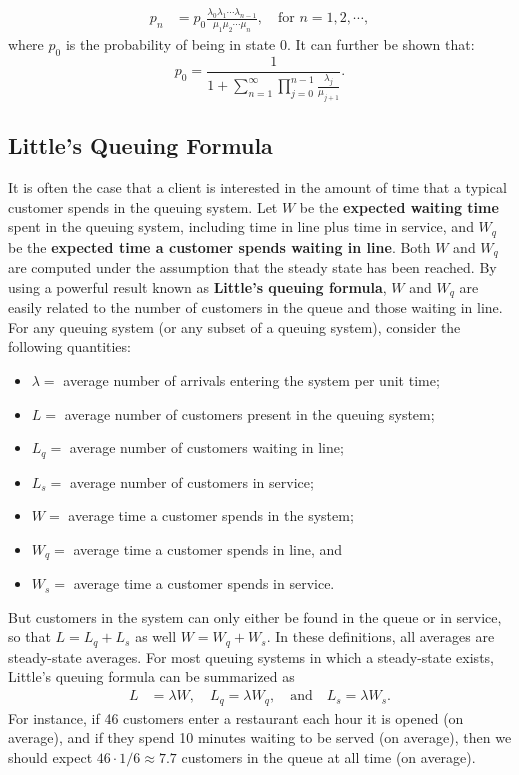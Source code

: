 \begin{align} p_{n} &= p_{0}\frac{\lambda_{0} \lambda_{1} \cdots \lambda_{n-1}}{\mu_{1} \mu_{2} \cdots \mu_{n}},\quad  \text{for    } n=1,2,\cdots,\label{eq:ssbr}
\end{align}
where $p_{0}$ is  the probability of being in state 0. It can further be shown  \cite{QS_K1} that:
$$ p_{0} = \frac{1}{1+ \sum^{\infty}_{n=1} \prod^{n-1}_{j=0} \frac{\lambda_{j}}{\mu_{j+1}}}.$$ 

\subsection{Little's Queuing Formula}
It is often the case that a client is interested in the amount of time that a typical customer spends in the queuing system. Let $W$ be the \textbf{expected waiting time} spent in the queuing system, including time in line plus time in service, and $W_{q}$ be the \textbf{expected time a customer spends waiting in line}. Both $W$ and $W_{q}$ are computed under the assumption that the steady state has been reached. By using a powerful result known as \textbf{Little's queuing formula}, $W$ and $W_{q}$ are easily related to the number of customers in the queue and those waiting in line. \newl  For any queuing system (or any subset of a queuing system), consider the following quantities:
\begin{itemize}[noitemsep]
\item $\lambda = $  average number of arrivals entering the system per unit time; 
\item $L =$  average number of customers present in the queuing system;
\item $L_{q} = $  average number of customers waiting in line;
\item $L_{s} = $  average number of customers in service;
\item $W = $  average time a customer spends in the system;
\item $W_{q} = $  average time a customer spends in line, and
\item $W_{s} = $  average time a customer spends in service.
\end{itemize}
But customers in the system can only either be found in the queue or in service, so that $L = L_{q} + L_{s}$ as well $W = W_{q} + W_{s}$.  In these definitions, all averages are steady-state averages. For most queuing systems in which a steady-state exists, Little's queuing formula can be summarized as 
\begin{align*}
L &=  \lambda W, \quad L_{q} = \lambda W_{q}, \quad\mbox{and}
\quad L_{s}= \lambda W_{s}.
\end{align*}
For instance, if 46 customers enter a restaurant each hour it is opened (on average), and if they spend 10 minutes waiting to be served (on average), then we should expect $46\cdot 1/6 \approx 7.7$ customers in the queue at all time (on average).   


